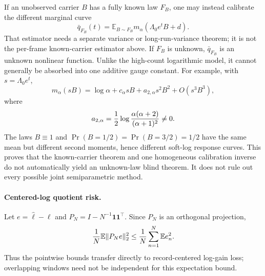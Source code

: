 If an unobserved carrier $B$ has a fully known law $F_B$, one may instead
calibrate the different marginal curve
\[
 \bar q_{F_B}(t)=\mathbb E_{B\sim F_B}
 m_\alpha(\Lambda_0e^tB+d).
\]
That estimator needs a separate variance or long-run-variance theorem;
it is not the per-frame known-carrier estimator above.  If $F_B$ is
unknown, $\bar q_{F_B}$ is an unknown nonlinear function.  Unlike the
high-count logarithmic model, it cannot generally be absorbed into one
additive gauge constant.  For example, with $s=\Lambda_0e^t$,
\[
 m_\alpha(sB)=\log\alpha+c_\alpha sB
 +a_{2,\alpha}s^2B^2+O(s^3B^3),
\]
where
\[
 a_{2,\alpha}={1\over2}
 \log{\alpha(\alpha+2)\over(\alpha+1)^2}\ne0.
\]
The laws $B\equiv1$ and
$\Pr(B=1/2)=\Pr(B=3/2)=1/2$ have the same mean but different second
moments, hence different soft-log response curves.  This proves that
the known-carrier theorem and one homogeneous calibration inverse do
not automatically yield an unknown-law blind theorem.  It does not
rule out every possible joint semiparametric method.

\paragraph{Centered-log quotient risk.}
Let $e=\widehat\ell-\ell$ and
$P_N=I-N^{-1}\mathbf1\mathbf1^\top$.  Since $P_N$ is an orthogonal
projection,
\[
 {1\over N}\mathbb E\|P_Ne\|_2^2
 \le {1\over N}\sum_{n=1}^N\mathbb Ee_n^2.
\]
Thus the pointwise bounds transfer directly to record-centered
log-gain loss; overlapping windows need not be independent for this
expectation bound.

